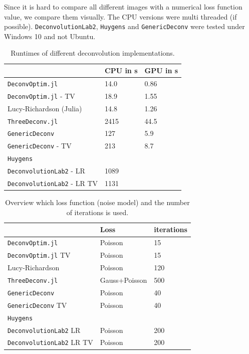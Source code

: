\documentclass{juliacon}
\begin{document}
        Since it is hard to compare all different images with a numerical loss function value, we compare them visually.
        The CPU versions were multi threaded (if possible). \verb|DeconvolutionLab2|, \verb|Huygens| and \verb|GenericDeconv| were tested under Windows 10 and not Ubuntu.
        \begin{table}[h]
            \begin{tabular}{l l l}
                &  CPU in s& GPU in s\\ 
            \hline
            \verb|DeconvOptim.jl| & 14.0 & 0.86\\
            \verb|DeconvOptim.jl| - TV & 18.9 & 1.55 \\
            Lucy-Richardson (Julia) & 14.8 & 1.26 \\
            \verb|ThreeDeconv.jl|& 2415 & 44.5 \\
            \verb|GenericDeconv|  & 127 & 5.9\\
            \verb|GenericDeconv| - TV & 213 & 8.7 \\
            \verb|Huygens|  & & \\
            \verb|DeconvolutionLab2| - LR & 1089 & \\
            \verb|DeconvolutionLab2| - LR TV& 1131 & 
            \end{tabular}
            \caption{Runtimes of different deconvolution implementations.}
            \label{tab:deconv}
        \end{table}

        \begin{table}[h]
            \begin{tabular}{l l l}
                & Loss & iterations \\ 
            \hline
            \verb|DeconvOptim.jl| & Poisson & 15 \\
            \verb|DeconvOptim.jl| TV & Poisson & 15\\
            Lucy-Richardson & Poisson & 120 \\
            \verb|ThreeDeconv.jl|  & Gauss+Poisson& 500\\
            \verb|GenericDeconv|  & Poisson & 40\\
            \verb|GenericDeconv| TV & Poisson & 40 \\
            \verb|Huygens|  & & \\
            \verb|DeconvolutionLab2| LR & Poisson & 200\\
            \verb|DeconvolutionLab2| LR TV& Poisson & 200 
            \end{tabular}
            \caption{Overview which loss function (noise model) and the number of iterations is used.}
            \label{tab:deconvprop}
        \end{table}
\end{document}
